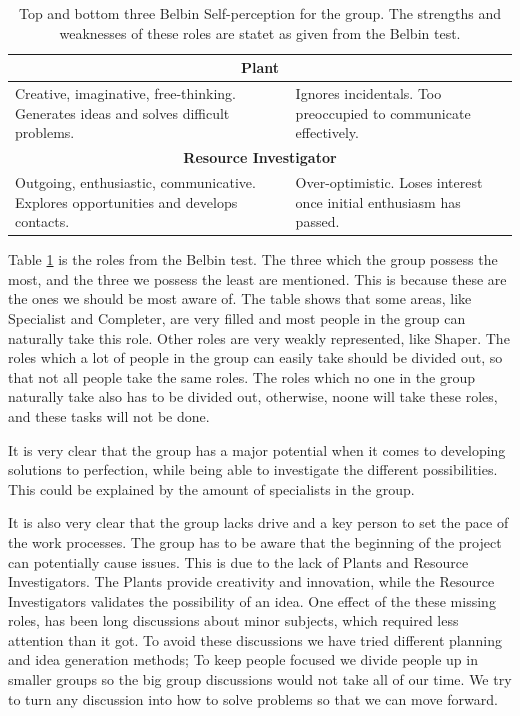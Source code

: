 \begin{table}[ht]
\begin{tabular}{|p{}|p{}|}
\multicolumn{2}{|c|}{\textbf{Plant}}                                                                                                                                             \\ \hline
Creative, imaginative, free-thinking. Generates ideas and solves difficult problems.              & Ignores incidentals. Too preoccupied to communicate effectively.             \\ \hline
\multicolumn{2}{|c|}{\textbf{Resource Investigator}}                                                                                                                             \\ \hline
Outgoing, enthusiastic, communicative. Explores opportunities and develops contacts.              & Over-optimistic. Loses interest once initial enthusiasm has passed.          \\ \hline
\end{tabular}
\caption[Top and bottom three Belbin Self-perception for the group.]{Top and bottom three Belbin Self-perception for the group. The strengths and weaknesses of these roles are statet as given from the Belbin test.}
\label{belbintable}
\end{table}

Table \ref{belbintable} is the roles from the Belbin test. 
The three which the group possess the most, and the three we possess the least are mentioned. This is because these are the ones we should be most aware of. 
The table shows that some areas, like Specialist and Completer, are very filled and most people in the group can naturally take this role. Other roles are very weakly represented, like Shaper. 
The roles which a lot of people in the group can easily take should be divided out, so that not all people take the same roles. The roles which no one in the group naturally take also has to be divided out, otherwise, noone will take these roles, and these tasks will not be done. 


It is very clear that the group has a major potential when it comes to developing solutions to perfection, while being able to investigate the different possibilities. 
This could be explained by the amount of specialists in the group.

It is also very clear that the group lacks drive and a key person to set the pace of the work processes. 
The group has to be aware that the beginning of the project can potentially cause issues. This is due to the lack of Plants and Resource Investigators. The Plants provide creativity and innovation, while the Resource Investigators validates the possibility of an idea. One effect of the these missing roles, has been long discussions about minor subjects, which required less attention than it got. To avoid these discussions we have tried different planning and idea generation methods; To keep people focused we divide people up in smaller groups so the big group discussions would not take all of our time. We try to turn any discussion into how to solve problems so that we can move forward.

